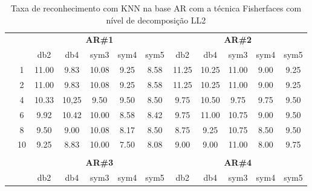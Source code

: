 \begin{table}[H]
	\centering
    \normalsize
	\caption{Taxa de reconhecimento com KNN na base AR com a técnica Fisherfaces com nível de decomposição LL2}
	\begin{tabular}{|c|c|c c c c c|c c c c c|}
\cline{3-12}
\multicolumn{2}{c|}{\multirow{2}{*}{}} & \multicolumn{5}{c|}{\textbf{AR\#1}}  & \multicolumn{5}{c|}{\textbf{AR\#2}} \\\cline{3-12}

\multicolumn{2}{c|}{}  & db2 & db4 & sym3 & sym4 & sym5 & db2 & db4& sym3 & sym4 & sym5 \\\hline

\multicolumn{1}{|c|}{ \multirow{5}{*}{\rotatebox[origin=c]{90}{\textbf{K-vizinhos}}} }
&1	&11.00&	9.83	&10.08&	9.25&	8.58&	11.25&	10.25&	11.00&	9.00&	9.25\\\cline{2-12}
&2	&11.00&	9.83	&10.08&	9.25&	8.58&	11.25&	10.25&	11.00&	9.00&	9.25\\\cline{2-12}
&4	&10.33&	10,25  	&9.50&	9.50&	8.50&	9.75&	10.50&	9.75&	9.75&	9.50\\\cline{2-12}
&6	&9.92	&10.42	&10.00&	8.58&	8.42&	9.75&	11.00	&10.75&	9.00&	9.50\\\cline{2-12}
&8	&9.50	&9.00	&10.08&	8.17&	8.50&	8.75&	9.25	&10.75&	8.50&	9.50\\\cline{2-12}
&10	&9.25	&8.83	&10.00& 7.50&	8.08&	9.00&	9.00	&11.00&	8.00&	9.75%


\\ \midrule
\multicolumn{12}{c}{}\\ 




\cline{3-12}
\multicolumn{2}{c}{} & \multicolumn{5}{|c|}{\textbf{AR\#3}}  & \multicolumn{5}{c|}{\textbf{AR\#4}} \\\cline{3-12}
\multicolumn{2}{c}{}  & \multicolumn{1}{|c}{db2} & db4 & sym3 & sym4 & sym5 & db2 & db4& sym3 & sym4 & sym5 \\\hline


\end{tabular}
\end{table}
